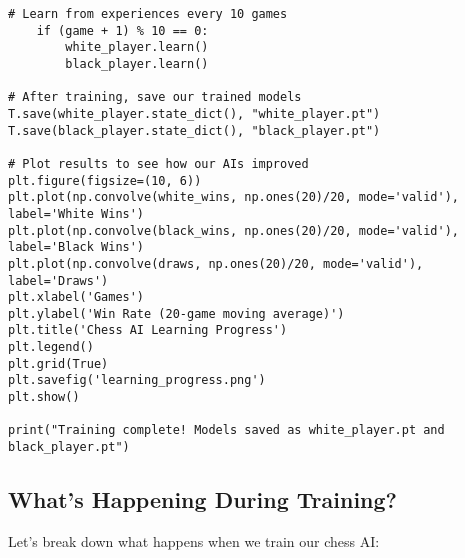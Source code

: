\documentclass[11pt]{article}
\begin{document}
\begin{tcolorbox}[colback=green!10!white,colframe=green!75!black,title=Complete Training Script,width=\textwidth]
\begin{minipage}{0.48\textwidth}
\begin{lstlisting}[style=Python,basicstyle=\ttfamily\scriptsize]
    # Learn from experiences every 10 games
    if (game + 1) % 10 == 0:
        white_player.learn()
        black_player.learn()

# After training, save our trained models
T.save(white_player.state_dict(), "white_player.pt")
T.save(black_player.state_dict(), "black_player.pt")

# Plot results to see how our AIs improved
plt.figure(figsize=(10, 6))
plt.plot(np.convolve(white_wins, np.ones(20)/20, mode='valid'), label='White Wins')
plt.plot(np.convolve(black_wins, np.ones(20)/20, mode='valid'), label='Black Wins')
plt.plot(np.convolve(draws, np.ones(20)/20, mode='valid'), label='Draws')
plt.xlabel('Games')
plt.ylabel('Win Rate (20-game moving average)')
plt.title('Chess AI Learning Progress')
plt.legend()
plt.grid(True)
plt.savefig('learning_progress.png')
plt.show()

print("Training complete! Models saved as white_player.pt and black_player.pt")
\end{lstlisting}
\end{minipage}
\end{tcolorbox}

\subsection{What's Happening During Training?}

Let's break down what happens when we train our chess AI:
\end{document}
